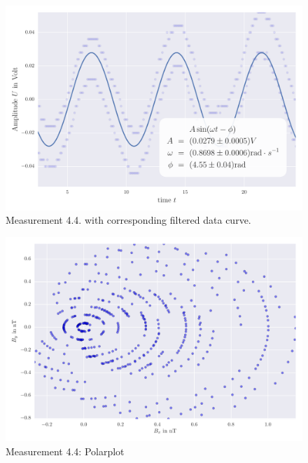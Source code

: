 \begin{figure}[H]
    \centering
    \includegraphics[width=0.7\linewidth]{analysis/figures/fit4_4}
    \caption{Measurement 4.4. with corresponding filtered data curve.}
    \label{fig:4_4_plot}
\end{figure}
\begin{figure}[H]
    \centering
    \includegraphics[width=0.7\linewidth]{analysis/figures/polar4_4}
    \caption{Measurement 4.4: Polarplot}
    \label{fig:4_4_polar}
\end{figure}

